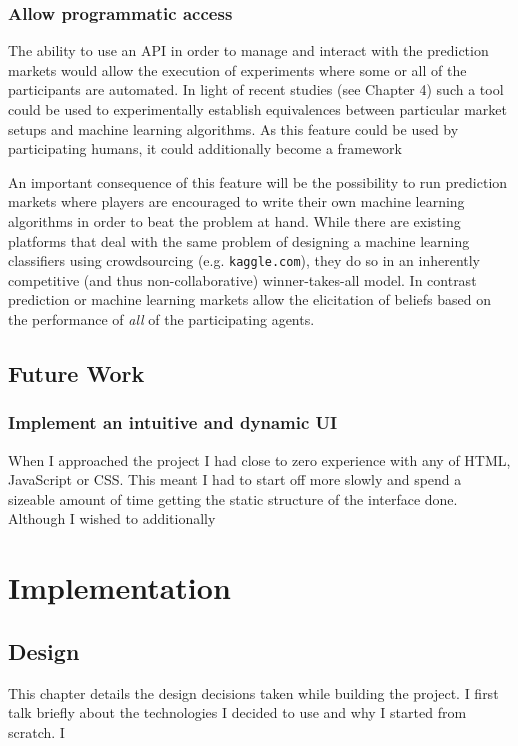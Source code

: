 \documentclass[bsc,frontabs,twoside,singlespacing,parskip,deptreport]{infthesis}     %
\begin{document}
\subsection{Allow programmatic access}
	The ability to use an API in order to manage and interact with the prediction markets would allow the execution of experiments where some or all of the participants are automated. In light of recent studies (see Chapter 4) such a tool could be used to experimentally establish equivalences between particular market setups and machine learning algorithms. As this feature could be used by participating humans, it could additionally become a framework 

	An important consequence of this feature will be the possibility to run prediction markets where players are encouraged to write their own machine learning algorithms in order to beat the problem at hand. While there are existing platforms that deal with the same problem of designing a machine learning classifiers using crowdsourcing (e.g. {\tt kaggle.com}), they do so in an inherently competitive (and thus non-collaborative) winner-takes-all model. In contrast prediction or machine learning markets allow the elicitation of beliefs based on the performance of {\em all} of the participating agents. 

\section{Future Work}
\subsection{Implement an intuitive and dynamic UI}
	When I approached the project I had close to zero experience with any of HTML, JavaScript or CSS. This meant I had to start off more slowly and spend a sizeable amount of time getting the static structure of the interface done. Although I wished to additionally 

\chapter{Implementation}

\section{Design}
	This chapter details the design decisions taken while building the project. I first talk briefly about the technologies I decided to use and why I started from scratch. I 
\end{document}
